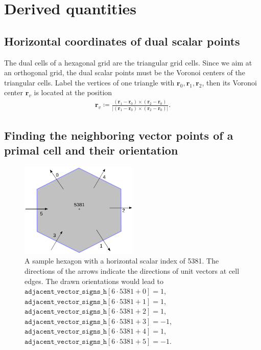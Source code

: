 \documentclass[10pt]{report}
\begin{document}
\section{Derived quantities}
\label{sec:derived_quantities}

\subsection{Horizontal coordinates of dual scalar points}
\label{sec:horizontal_coordinates_of_dual_scalar_points}

The dual cells of a hexagonal grid are the triangular grid cells. Since we aim at an orthogonal grid, the dual scalar points must be the Voronoi centers of the triangular cells. Label the vertices of one triangle with $\mathbf{r}_0, \mathbf{r}_1, \mathbf{r}_2$, then its Voronoi center $\mathbf{r}_v$ is located at the position
%
\begin{align}
\mathbf{r}_v \coloneqq \frac{\left(\mathbf{r}_1 - \mathbf{r}_0\right)\times\left(\mathbf{r}_2 - \mathbf{r}_0\right)}{\left|\left(\mathbf{r}_1 - \mathbf{r}_0\right)\times\left(\mathbf{r}_2 - \mathbf{r}_0\right)\right|}.
\end{align}

\subsection{Finding the neighboring vector points of a primal cell and their orientation}
\label{sec:finding_the_neighboring_vector_points_of_a_primal_cell_and_their_orientation}

\begin{figure}
\begin{center}
\includegraphics[width = 0.5\textwidth]{hexagonal_grid_1.pdf}
\caption{A sample hexagon with a horizontal scalar index of 5381. The directions of the arrows indicate the directions of unit vectors at cell edges. The drawn orientations would lead to $\texttt{adjacent\_vector\_signs\_h}[6\cdot 5381 + 0] = 1$, $\texttt{adjacent\_vector\_signs\_h}[6\cdot 5381 + 1] = 1$, $\texttt{adjacent\_vector\_signs\_h}[6\cdot 5381 + 2] = 1$, $\texttt{adjacent\_vector\_signs\_h}[6\cdot 5381 + 3] = -1$, $\texttt{adjacent\_vector\_signs\_h}[6\cdot 5381 + 4] = 1$, $\texttt{adjacent\_vector\_signs\_h}[6\cdot 5381 + 5] = -1$.}
\label{fig:hexagonal_grid_1}
\end{center}
\end{figure}
\end{document}

